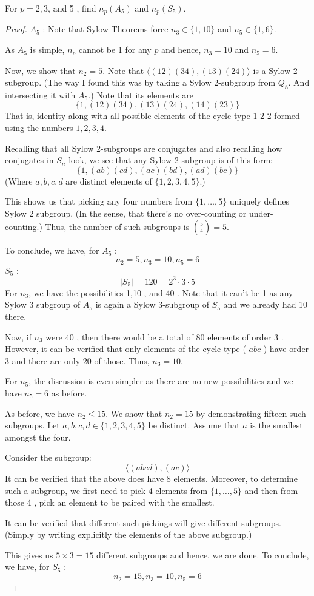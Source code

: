 \begin{exercise}
For $p=2,3$, and 5 , find $n_p\left(A_5\right)$ and $n_p\left(S_5\right)$.
\end{exercise}
\begin{proof}
$A_5$ :
Note that Sylow Theorems force $n_3 \in\{1,10\}$ and $n_5 \in\{1,6\}$.

As $A_5$ is simple, $n_p$ cannot be 1 for any $p$ and hence, $n_3=10$ and $n_5=6$.

Now, we show that $n_2=5$. Note that $\langle(12)(34),(13)(24)\rangle$ is a Sylow 2-subgroup. (The way I found this was by taking a Sylow 2-subgroup from $Q_8$. And intersecting it with $A_5$.) Note that its elements are
\[
\{1,(12)(34),(13)(24),(14)(23)\}
\]
That is, identity along with all possible elements of the cycle type 1-2-2 formed using the numbers $1,2,3,4$.

Recalling that all Sylow 2-subgroups are conjugates and also recalling how conjugates in $S_n$ look, we see that any Sylow 2-subgroup is of this form:
\[
\{1,(a b)(c d),(a c)(b d),(a d)(b c)\}
\]
(Where $a, b, c, d$ are distinct elements of $\{1,2,3,4,5\}$.)

This shows us that picking any four numbers from $\{1, \ldots, 5\}$ uniquely defines Sylow 2 subgroup. (In the sense, that there's no over-counting or under-counting.) Thus, the number of such subgroups is $\binom{5}{4}=5$.

To conclude, we have, for $A_5$ :
\[
n_2=5, n_3=10, n_5=6
\]
$S_5$ :
\[
\left|S_5\right|=120=2^3 \cdot 3 \cdot 5
\]
For $n_3$, we have the possibilities 1,10 , and 40 . Note that it can't be 1 as any Sylow 3 subgroup of $A_5$ is again a Sylow 3-subgroup of $S_5$ and we already had 10 there.

Now, if $n_3$ were 40 , then there would be a total of 80 elements of order 3 . However, it can be verified that only elements of the cycle type ( $a b c$ ) have order 3 and there are only 20 of those. Thus, $n_3=10$.

For $n_5$, the discussion is even simpler as there are no new possibilities and we have $n_5=6$ as before.

As before, we have $n_2 \leq 15$. We show that $n_2=15$ by demonstrating fifteen such subgroups. Let $a, b, c, d \in\{1,2,3,4,5\}$ be distinct. Assume that $a$ is the smallest amongst the four.

Consider the subgroup:
\[
\langle(a b c d),(a c)\rangle
\]
It can be verified that the above does have 8 elements. Moreover, to determine such a subgroup, we first need to pick 4 elements from $\{1, \ldots, 5\}$ and then from those 4 , pick an element to be paired with the smallest.

It can be verified that different such pickings will give different subgroups. (Simply by writing explicitly the elements of the above subgroup.)

This gives us $5 \times 3=15$ different subgroups and hence, we are done.
To conclude, we have, for $S_5$ :
\[
n_2=15, n_3=10, n_5=6
\]
\end{proof}

